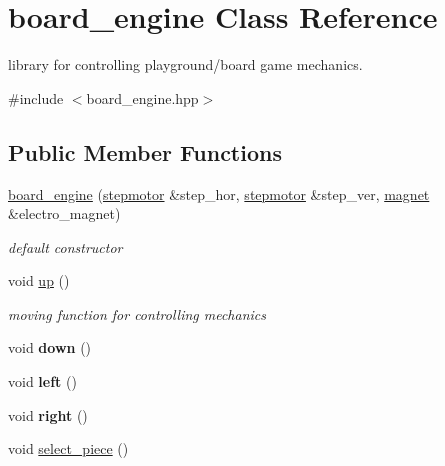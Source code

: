 \hypertarget{classboard__engine}{}\section{board\+\_\+engine Class Reference}
\label{classboard__engine}


library for controlling playground/board game mechanics.  




{\ttfamily \#include $<$board\+\_\+engine.\+hpp$>$}

\subsection*{Public Member Functions}
\begin{DoxyCompactItemize}
\item 
\hyperlink{classboard__engine_a7b20707f49ad54a783fb1b31173ac938}{board\+\_\+engine} (\hyperlink{classstepmotor}{stepmotor} \&step\+\_\+hor, \hyperlink{classstepmotor}{stepmotor} \&step\+\_\+ver, \hyperlink{classmagnet}{magnet} \&electro\+\_\+magnet)
\begin{DoxyCompactList}\small\item\em default constructor \end{DoxyCompactList}\item 
void \hyperlink{classboard__engine_a45fc13a95ffe530fdef54f66f8122374}{up} ()\hypertarget{classboard__engine_a45fc13a95ffe530fdef54f66f8122374}{}\label{classboard__engine_a45fc13a95ffe530fdef54f66f8122374}

\begin{DoxyCompactList}\small\item\em moving function for controlling mechanics \end{DoxyCompactList}\item 
void {\bfseries down} ()\hypertarget{classboard__engine_ac7be72f5919f83898148bd8ea30142f8}{}\label{classboard__engine_ac7be72f5919f83898148bd8ea30142f8}

\item 
void {\bfseries left} ()\hypertarget{classboard__engine_ab741c659f4db133d9df480ccab3046ca}{}\label{classboard__engine_ab741c659f4db133d9df480ccab3046ca}

\item 
void {\bfseries right} ()\hypertarget{classboard__engine_ae8ede3e502c0a52bace0f0faf3d8f049}{}\label{classboard__engine_ae8ede3e502c0a52bace0f0faf3d8f049}

\item 
void \hyperlink{classboard__engine_ad5e82ee1bd2519f2e2ce1084a1406101}{select\+\_\+piece} ()\hypertarget{classboard__engine_ad5e82ee1bd2519f2e2ce1084a1406101}{}\label{classboard__engine_ad5e82ee1bd2519f2e2ce1084a1406101}


\end{DoxyCompactItemize}
